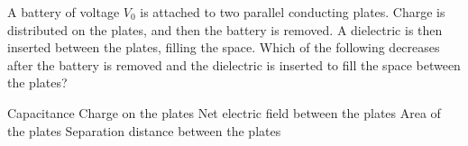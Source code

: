 \documentclass{../../../oss-ap12ibhl}
\begin{document}
\begin{questions}
%

  \question A battery of voltage $V_0$ is attached to two parallel conducting
  plates. Charge is distributed on the plates, and then the battery is
  removed. A dielectric is then inserted between the plates, filling the
  space. Which of the following decreases after the battery is removed and the
  dielectric is inserted to fill the space between the plates?
  \begin{choices}
    \choice Capacitance
    \choice Charge on the plates
    \choice Net electric field between the plates
    \choice Area of the plates
    \choice Separation distance between the plates
  \end{choices}
    

\end{questions}
\end{document}
